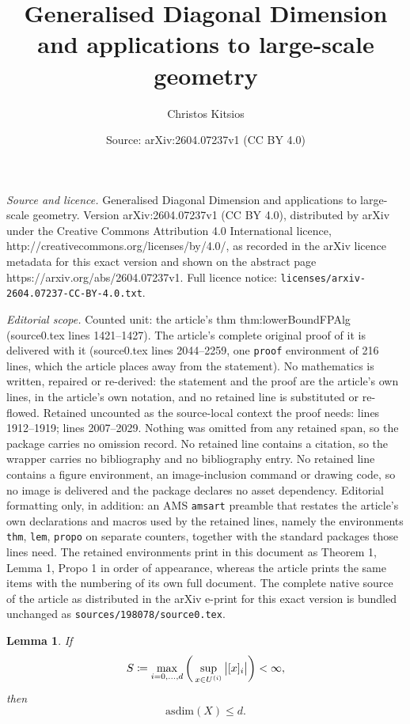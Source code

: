 \documentclass[10pt,a4paper]{amsart}
\title{Generalised Diagonal Dimension and applications to large-scale geometry}
\author{Christos Kitsios}
\date{Source: arXiv:2604.07237v1 (CC BY 4.0)}
\newtheorem{lem}{Lemma}
\newcommand{\asdim}[1]{\mathrm{asdim}({#1})}
\begin{document}
\maketitle

\noindent\emph{Source and licence.} Generalised Diagonal Dimension and applications to large-scale geometry. Version arXiv:2604.07237v1 (CC BY 4.0), distributed by arXiv under the Creative Commons Attribution 4.0 International licence, http://creativecommons.org/licenses/by/4.0/, as recorded in the arXiv licence metadata for this exact version and shown on the abstract page https://arxiv.org/abs/2604.07237v1. Full licence notice: \texttt{licenses/arxiv-2604.07237-CC-BY-4.0.txt}.\par\smallskip

\noindent\textit{Editorial scope.} Counted unit: the article's thm thm:lowerBoundFPAlg (source0.tex lines 1421--1427). The article's complete original proof of it is delivered with it (source0.tex lines 2044--2259, one \texttt{proof} environment of 216 lines, which the article places away from the statement). No mathematics is written, repaired or re-derived: the statement and the proof are the article's own lines, in the article's own notation, and no retained line is substituted or re-flowed.  Retained uncounted as the source-local context the proof needs: lines 1912--1919; lines 2007--2029.  Nothing was omitted from any retained span, so the package carries no omission record.  No retained line contains a citation, so the wrapper carries no bibliography and no bibliography entry.  No retained line contains a figure environment, an image-inclusion command or drawing code, so no image is delivered and the package declares no asset dependency.  Editorial formatting only, in addition: an AMS \texttt{amsart} preamble that restates the article's own declarations and macros used by the retained lines, namely the environments \texttt{thm}, \texttt{lem}, \texttt{propo} on separate counters, together with the standard packages those lines need.  The retained environments print in this document as Theorem 1, Lemma 1, Propo 1 in order of appearance, whereas the article prints the same items with the numbering of its own full document.  The complete native source of the article as distributed in the arXiv e-print for this exact version is bundled unchanged as \texttt{sources/198078/source0.tex}.
    \begin{lem}\label{lem:LowerBoundProof1}
    If
    \begin{equation*}
        S\coloneq \max_{i=0,\hdots,d} \bigg(\sup_{x \in U^{(i)}} \big{\lvert}{ [ x ]_{i}}   \big{\rvert} \bigg) < \infty ,
    \end{equation*}
    then
    \[\asdim{X} \le d.\]
    \end{lem}
\end{document}
